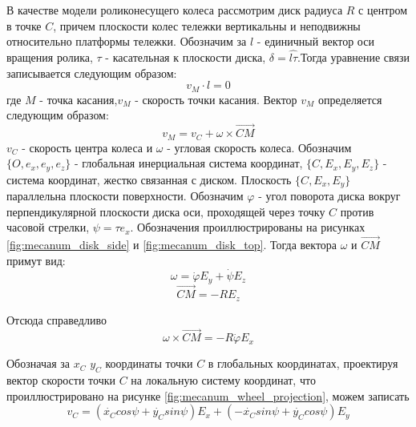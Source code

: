 \documentclass[oneside,final,14pt]{extreport}
\begin{document}
\begin{figure}[H]
\end{figure}

 В качестве модели роликонесущего колеса рассмотрим диск радиуса $R$ с центром в точке $C$, причем плоскости колес тележки вертикальны и неподвижны относительно платформы тележки. Обозначим за $l$ - единичный вектор оси вращения ролика, $\tau$ - касательная к плоскости диска, $\delta = \widehat{l \tau}$.Тогда уравнение связи записывается следующим образом:
\begin{equation}
v_{M}
\cdot
l
=
0
\end{equation}
где $M$ - точка касания,$v_{M}$ - скорость точки касания. Вектор $v_{M}$ определяется следующим образом:
\begin{equation}
v_{M}
=
v_{C}
+
\omega
\times
\overrightarrow{CM}
\end{equation}
 $v_{C}$ -   
скорость центра колеса и  $\omega$ - угловая скорость колеса.
Обозначим $\{O,e_{x},e_{y},e_{z}\}$ - глобальная инерциальная система координат, $\{C,E_{x},E_{y},E_{z}\}$ - система координат, жестко связанная с диском. Плоскость $\{C,E_{x},E_{y}\}$ параллельна плоскости поверхности. Обозначим $\varphi$ - угол поворота диска вокруг перпендикулярной плоскости диска оси, проходящей через точку $C$ против часовой стрелки, $\psi = \widehat{\tau e_{x}}$. Обозначения проиллюстрированы на рисунках \ref{fig:mecanum_disk_side} и \ref{fig:mecanum_disk_top}. Тогда вектора $\omega$ и $\overrightarrow{CM}$ примут вид:
\begin{equation}
\omega
=
\dot{\varphi}
E_{y}
+
\dot{\psi}
E_{z}
\end{equation}
\begin{equation}
\overrightarrow{CM}
=
-R
E_{z}
\end{equation}

Отсюда справедливо
\begin{equation}
\omega
\times
\overrightarrow{CM}
=
-R\dot{\varphi}
E_{x}
\end{equation} 

Обозначая за $x_{C}$ $y_{C}$ координаты точки $C$ в глобальных координатах, проектируя вектор скорости точки $C$ на локальную систему координат, что проиллюстрировано на рисунке \ref{fig:mecanum_wheel_projection}, можем записать
\begin{equation}
v_{C}
=
(
\dot{x_{C}}
cos\psi
+
\dot{y_{C}}
sin\psi
)
E_{x}
+
(
-\dot{x_{C}}
sin\psi
+
\dot{y_{C}}
cos\psi
)
E_{y}
\end{equation}
\end{document}
